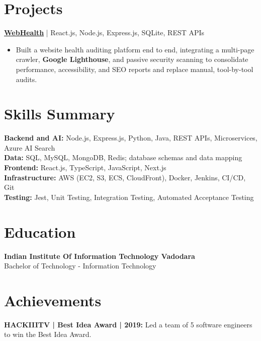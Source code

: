 \documentclass[a4paper,10pt]{article}
\begin{document}
\section{Projects}
\textbf{\href{https://web-health-eta.vercel.app/}{WebHealth}} | React.js, Node.js, Express.js, SQLite, REST APIs
\begin{itemize}
\item Built a website health auditing platform end to end, integrating a multi-page crawler, \textbf{Google Lighthouse}, and passive security scanning to consolidate performance, accessibility, and SEO reports and replace manual, tool-by-tool audits.
\end{itemize}

\section{Skills Summary}
\textbf{Backend and AI:} Node.js, Express.js, Python, Java, REST APIs, Microservices, Azure AI Search\\
\textbf{Data:} SQL, MySQL, MongoDB, Redis; database schemas and data mapping\\
\textbf{Frontend:} React.js, TypeScript, JavaScript, Next.js\\
\textbf{Infrastructure:} AWS (EC2, S3, ECS, CloudFront), Docker, Jenkins, CI/CD, Git\\
\textbf{Testing:} Jest, Unit Testing, Integration Testing, Automated Acceptance Testing

\section{Education}
\textbf{Indian Institute Of Information Technology Vadodara}\\
Bachelor of Technology - Information Technology

\section{Achievements}
\textbf{HACKIIITV | Best Idea Award | 2019:} Led a team of 5 software engineers to win the Best Idea Award.
\end{document}
